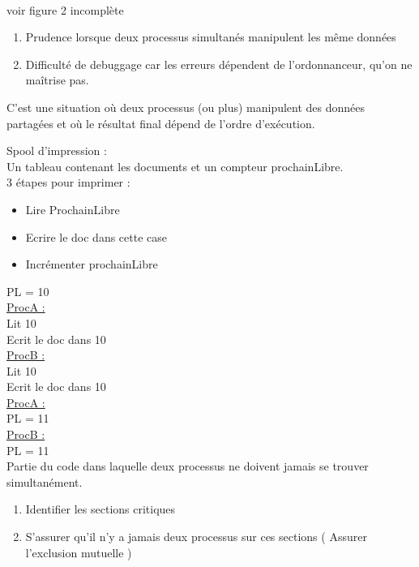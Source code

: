  \\

 voir figure 2 incomplète\\

\begin{enumerate}
	\item Prudence lorsque deux processus simultanés manipulent les même données
	\item Difficulté de debuggage car les erreurs dépendent de l'ordonnanceur, qu'on ne maîtrise pas.
\end{enumerate}

 C'est une situation où deux processus (ou plus) manipulent des données partagées et où le résultat final dépend de l'ordre d'exécution.

 Spool d'impression : \\
Un tableau contenant les documents et un compteur prochainLibre. \\
3 étapes pour imprimer : 
\begin{itemize}
	\item Lire ProchainLibre
	\item Ecrire le doc dans cette case
	\item Incrémenter prochainLibre
\end{itemize}
PL = 10 \\

\underline{ProcA :}\\
Lit 10\\
Ecrit le doc dans 10\\
\underline{ProcB :}\\
Lit 10\\
Ecrit le doc dans 10\\
\underline{ProcA :}\\
PL = 11\\
\underline{ProcB :}\\
PL = 11\\

 Partie du code dans laquelle deux processus ne doivent jamais se trouver simultanément. \\

\newpage

\begin{enumerate}
	\item Identifier les sections critiques
	\item S'assurer qu'il n'y a jamais deux processus sur ces sections ( Assurer l'exclusion mutuelle )
\end{enumerate} 

